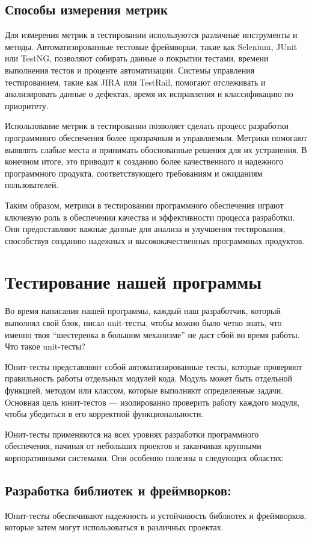     \subsection{Способы измерения метрик}
    Для измерения метрик в тестировании используются различные инструменты и методы. Автоматизированные тестовые фреймворки, такие как Selenium, JUnit или TestNG, позволяют собирать данные о покрытии тестами, времени выполнения тестов и проценте автоматизации. Системы управления тестированием, такие как JIRA или TestRail, помогают отслеживать и анализировать данные о дефектах, время их исправления и классификацию по приоритету. 
    
    Использование метрик в тестировании позволяет сделать процесс разработки программного обеспечения более прозрачным и управляемым. Метрики помогают выявлять слабые места и принимать обоснованные решения для их устранения. В конечном итоге, это приводит к созданию более качественного и надежного программного продукта, соответствующего требованиям и ожиданиям пользователей. 
    
    Таким образом, метрики в тестировании программного обеспечения играют ключевую роль в обеспечении качества и эффективности процесса разработки. Они предоставляют важные данные для анализа и улучшения тестирования, способствуя созданию надежных и высококачественных программных продуктов.

    \section{Тестирование нашей программы}
    Во время написания нашей программы, каждый наш разработчик, который выполнял свой блок, писал unit-тесты, чтобы можно было четко знать, что именно твоя “шестеренка в большом механизме” не даст сбой во время работы. Что такое unit-тесты?

    Юнит-тесты представляют собой автоматизированные тесты, которые проверяют правильность работы отдельных модулей кода. Модуль может быть отдельной функцией, методом или классом, которые выполняют определенные задачи. Основная цель юнит-тестов — изолированно проверить работу каждого модуля, чтобы убедиться в его корректной функциональности.

    Юнит-тесты применяются на всех уровнях разработки программного обеспечения, начиная от небольших проектов и заканчивая крупными корпоративными системами. Они особенно полезны в следующих областях: 

    \subsection*{Разработка библиотек и фреймворков:}
    Юнит-тесты обеспечивают надежность и устойчивость библиотек и фреймворков, которые затем могут использоваться в различных проектах. 

